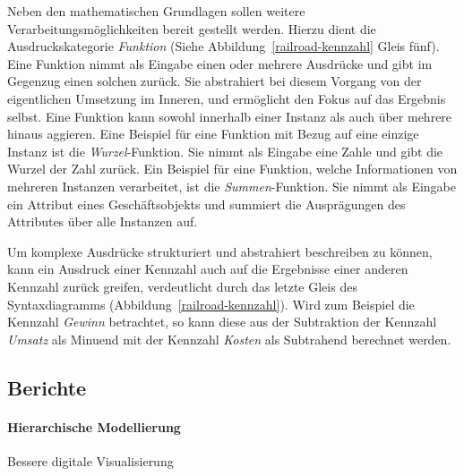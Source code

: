 \documentclass[
  language=german, %
  type=bachelor%
]{isthesis}
\begin{document}
\begin{content}
  Neben den mathematischen Grundlagen sollen weitere Verarbeitungsmöglichkeiten
  bereit gestellt werden. Hierzu dient die Ausdruckskategorie \textit{Funktion}
  (Siehe Abbildung~\ref{railroad-kennzahl} Gleis fünf). Eine Funktion nimmt als
  Eingabe einen oder mehrere Ausdrücke und gibt im Gegenzug einen solchen
  zurück. Sie abstrahiert bei diesem Vorgang von der eigentlichen Umsetzung im
  Inneren, und ermöglicht den Fokus auf das Ergebnis selbst. Eine Funktion kann
  sowohl innerhalb einer Instanz als auch über mehrere hinaus aggieren. Eine
  Beispiel für eine Funktion mit Bezug auf eine einzige Instanz ist die
  \textit{Wurzel}-Funktion.  Sie nimmt als Eingabe eine Zahle und gibt die
  Wurzel der Zahl zurück. Ein Beispiel für eine Funktion, welche Informationen
  von mehreren Instanzen verarbeitet, ist die \textit{Summen}-Funktion. Sie
  nimmt als Eingabe ein Attribut eines Geschäftsobjekts und summiert die
  Ausprägungen des Attributes über alle Instanzen auf. 

  Um komplexe Ausdrücke strukturiert und abstrahiert beschreiben zu können,
  kann ein Ausdruck einer Kennzahl auch auf die Ergebnisse einer anderen
  Kennzahl zurück greifen, verdeutlicht durch das letzte Gleis des
  Syntaxdiagramms (Abbildung~\ref{railroad-kennzahl}). Wird zum Beispiel die
  Kennzahl \textit{Gewinn} betrachtet, so kann diese aus der Subtraktion der
  Kennzahl \textit{Umsatz} als Minuend mit der Kennzahl \textit{Kosten} als
  Subtrahend berechnet werden.


  \subsection{Berichte}

  \begin{figure}[caption={Metamodell der \textit{DataFurnace}-Sprache}, label={fig:img01}]
    \resizebox{\columnwidth}{!}{}
  \end{figure}

  \paragraph{Hierarchische Modellierung}
  Bessere digitale Visualisierung~\citep[][S. 6 f.]{fleischer2013konstruktion}



\end{content}
\end{document}
